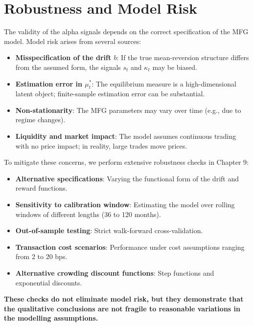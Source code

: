 \section{Robustness and Model Risk}
\label{sec:alpha-robustness}

The validity of the alpha signals depends on the correct specification of the MFG
model. Model risk arises from several sources:

\begin{itemize}
    \item \textbf{Misspecification of the drift $b$}: If the true mean-reversion
    structure differs from the assumed form, the signals $s_t$ and $\kappa_t$ may be
    biased.
    \item \textbf{Estimation error in $\mu_t^*$}: The equilibrium measure is a
    high-dimensional latent object; finite-sample estimation error can be
    substantial.
    \item \textbf{Non-stationarity}: The MFG parameters may vary over time (e.g.,
    due to regime changes).
    \item \textbf{Liquidity and market impact}: The model assumes continuous
    trading with no price impact; in reality, large trades move prices.
\end{itemize}

To mitigate these concerns, we perform extensive robustness checks in Chapter 9:

\begin{itemize}
    \item \textbf{Alternative specifications}: Varying the functional form of the
    drift and reward functions.
    \item \textbf{Sensitivity to calibration window}: Estimating the model over
    rolling windows of different lengths (36 to 120 months).
    \item \textbf{Out-of-sample testing}: Strict walk-forward cross-validation.
    \item \textbf{Transaction cost scenarios}: Performance under cost assumptions
    ranging from 2 to 20 bps.
    \item \textbf{Alternative crowding discount functions}: Step functions and
    exponential discounts.
\end{itemize}

\textbf{These checks do not eliminate model risk, but they demonstrate that the
qualitative conclusions are not fragile to reasonable variations in the modelling
assumptions.}

